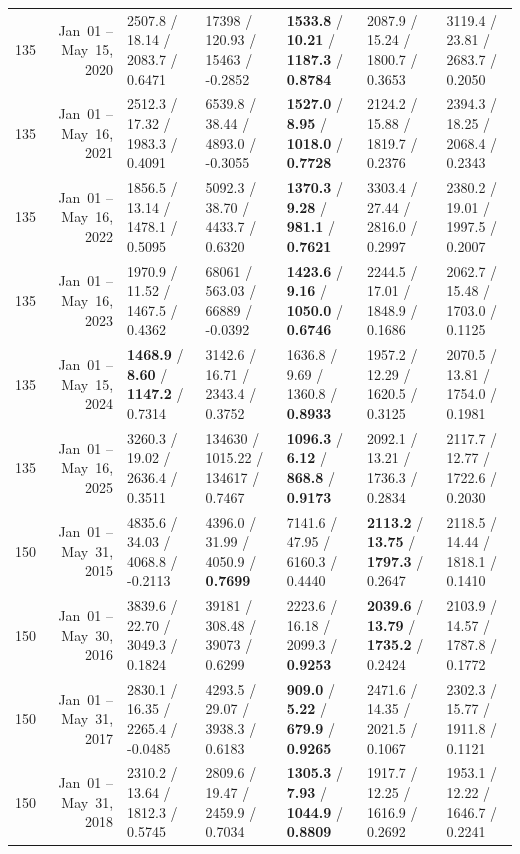 \begin{longtable}{r r l l l l l}
135 & Jan~01 -- May~15, 2020 & 2507.8 / 18.14 / 2083.7 / 0.6471 & 17398 / 120.93 / 15463 / -0.2852 & \textbf{1533.8} / \textbf{10.21} / \textbf{1187.3} / \textbf{0.8784} & 2087.9 / 15.24 / 1800.7 / 0.3653 & 3119.4 / 23.81 / 2683.7 / 0.2050 \\
135 & Jan~01 -- May~16, 2021 & 2512.3 / 17.32 / 1983.3 / 0.4091 & 6539.8 / 38.44 / 4893.0 / -0.3055 & \textbf{1527.0} / \textbf{8.95} / \textbf{1018.0} / \textbf{0.7728} & 2124.2 / 15.88 / 1819.7 / 0.2376 & 2394.3 / 18.25 / 2068.4 / 0.2343 \\
135 & Jan~01 -- May~16, 2022 & 1856.5 / 13.14 / 1478.1 / 0.5095 & 5092.3 / 38.70 / 4433.7 / 0.6320 & \textbf{1370.3} / \textbf{9.28} / \textbf{981.1} / \textbf{0.7621} & 3303.4 / 27.44 / 2816.0 / 0.2997 & 2380.2 / 19.01 / 1997.5 / 0.2007 \\
135 & Jan~01 -- May~16, 2023 & 1970.9 / 11.52 / 1467.5 / 0.4362 & 68061 / 563.03 / 66889 / -0.0392 & \textbf{1423.6} / \textbf{9.16} / \textbf{1050.0} / \textbf{0.6746} & 2244.5 / 17.01 / 1848.9 / 0.1686 & 2062.7 / 15.48 / 1703.0 / 0.1125 \\
135 & Jan~01 -- May~15, 2024 & \textbf{1468.9} / \textbf{8.60} / \textbf{1147.2} / 0.7314 & 3142.6 / 16.71 / 2343.4 / 0.3752 & 1636.8 / 9.69 / 1360.8 / \textbf{0.8933} & 1957.2 / 12.29 / 1620.5 / 0.3125 & 2070.5 / 13.81 / 1754.0 / 0.1981 \\
135 & Jan~01 -- May~16, 2025 & 3260.3 / 19.02 / 2636.4 / 0.3511 & 134630 / 1015.22 / 134617 / 0.7467 & \textbf{1096.3} / \textbf{6.12} / \textbf{868.8} / \textbf{0.9173} & 2092.1 / 13.21 / 1736.3 / 0.2834 & 2117.7 / 12.77 / 1722.6 / 0.2030 \\
\midrule
150 & Jan~01 -- May~31, 2015 & 4835.6 / 34.03 / 4068.8 / -0.2113 & 4396.0 / 31.99 / 4050.9 / \textbf{0.7699} & 7141.6 / 47.95 / 6160.3 / 0.4440 & \textbf{2113.2} / \textbf{13.75} / \textbf{1797.3} / 0.2647 & 2118.5 / 14.44 / 1818.1 / 0.1410 \\
150 & Jan~01 -- May~30, 2016 & 3839.6 / 22.70 / 3049.3 / 0.1824 & 39181 / 308.48 / 39073 / 0.6299 & 2223.6 / 16.18 / 2099.3 / \textbf{0.9253} & \textbf{2039.6} / \textbf{13.79} / \textbf{1735.2} / 0.2424 & 2103.9 / 14.57 / 1787.8 / 0.1772 \\
150 & Jan~01 -- May~31, 2017 & 2830.1 / 16.35 / 2265.4 / -0.0485 & 4293.5 / 29.07 / 3938.3 / 0.6183 & \textbf{909.0} / \textbf{5.22} / \textbf{679.9} / \textbf{0.9265} & 2471.6 / 14.35 / 2021.5 / 0.1067 & 2302.3 / 15.77 / 1911.8 / 0.1121 \\
150 & Jan~01 -- May~31, 2018 & 2310.2 / 13.64 / 1812.3 / 0.5745 & 2809.6 / 19.47 / 2459.9 / 0.7034 & \textbf{1305.3} / \textbf{7.93} / \textbf{1044.9} / \textbf{0.8809} & 1917.7 / 12.25 / 1616.9 / 0.2692 & 1953.1 / 12.22 / 1646.7 / 0.2241 \\

\end{longtable}
